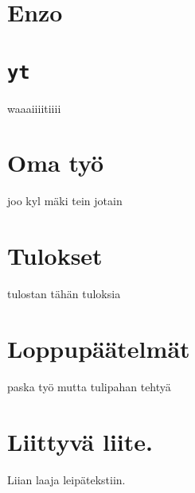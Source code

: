 \documentclass[12pt,a4paper]{article}
\begin{document}



\section{Enzo}


\section{\texttt{yt}}
waaaiiiitiiii


\section{Oma työ}
joo kyl mäki tein jotain


\section{Tulokset}
tulostan tähän tuloksia


\section{Loppupäätelmät}
paska työ mutta tulipahan tehtyä




\appendix
\newpage
\section{Liittyvä liite.} \label{koodi}
Liian laaja leipätekstiin.
\end{document}
